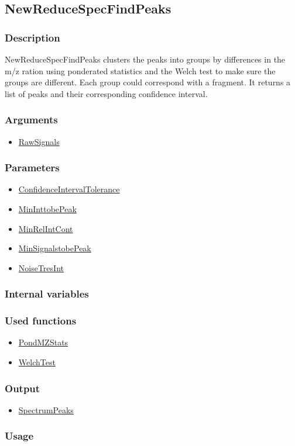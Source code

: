 \subsection{NewReduceSpecFindPeaks}\label{NewReduceSpecFindPeaks}
\subsubsection{Description}

NewReduceSpecFindPeaks clusters the peaks into groups by differences in the m/z ration using ponderated statistics and the Welch test to make sure the groups are different. Each group could correspond with a fragment. It returns a list of peaks and their corresponding confidence interval.

\subsubsection{Arguments}
\begin{itemize}
\item \hyperref[RawSignals]{RawSignals}
\end{itemize}
\subsubsection{Parameters}
\begin{itemize}
\item \hyperref[ConfidenceIntervalTolerance]{ConfidenceIntervalTolerance}
\item \hyperref[MinInttobePeak]{MinInttobePeak}
\item \hyperref[MinRelIntCont]{MinRelIntCont}
\item \hyperref[MinSignalstobePeak]{MinSignalstobePeak}
\item \hyperref[NoiseTresInt]{NoiseTresInt}
\end{itemize}
\subsubsection{Internal variables}
\subsubsection{Used functions}
\begin{itemize}
\item \hyperref[PondMZStats]{PondMZStats}
\item \hyperref[WelchTest]{WelchTest}
\end{itemize}
\subsubsection{Output}
\begin{itemize}

\item \hyperref[SpectrumPeaks]{SpectrumPeaks} %
\end{itemize}

\subsubsection{Usage}

